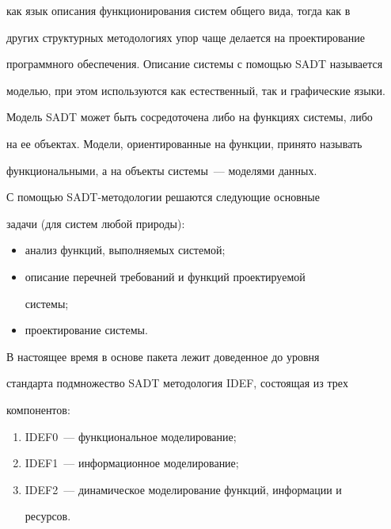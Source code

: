 как язык описания функционирования систем общего вида, тогда как в 


других структурных методологиях упор чаще делается на проектирование 


программного обеспечения. Описание системы с помощью SADT называется 


моделью, при этом используются как естественный, так и графические языки. 


Мо\-дель SADT может быть сосредоточена либо на функциях системы, либо 


на ее объектах. Модели, ориентированные на функции, принято называть 


функциональными, а на объекты системы~--- моделями данных. 


       


       С помощью SADT-методологии решаются следующие основные 


задачи (для систем любой природы): 


       \begin{itemize}


       \item анализ функций, выполняемых системой; 


       \item описание перечней требований и функций проектируемой 


системы; 


       \item проектирование системы. 


       \end{itemize}


       


       В настоящее время в основе пакета лежит доведенное до уровня 


стандарта подмножество SADT методология IDEF, состоящая из трех 


компонентов: 


       \begin{enumerate}[(1)]


       \item IDEF0~--- функциональное моделирование; 


       \item IDEF1~--- информационное моделирование; 


       \item IDEF2~--- динамическое моделирование функций, информации и 


ресурсов. 


       \end{enumerate}


